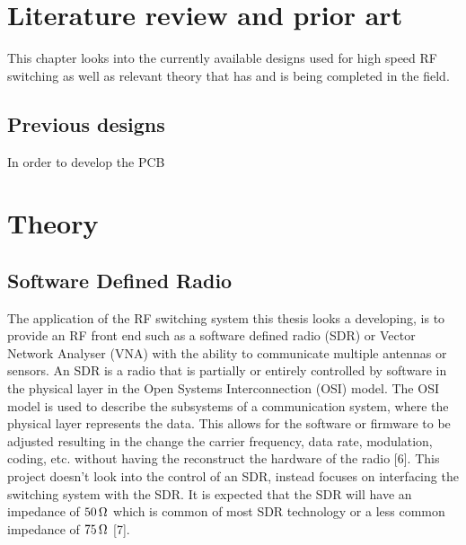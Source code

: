 \documentclass[12pt,openany,a4paper]{book}
\newcommand{\ohm}	{\ensuremath{\rm\,\Omega}}
\begin{document}
\chapter{Literature review and prior art}

This chapter looks into the currently available designs used for high speed RF switching as well as relevant theory that has and is being completed in the field.


\section{Previous designs}
In order to develop the PCB 















\chapter{Theory}
\section{Software Defined Radio}
The application of the RF switching system this thesis looks a developing, is to provide an RF front end such as a software defined radio (SDR) or Vector Network Analyser (VNA) with the ability to communicate multiple antennas or sensors. An SDR is a radio that is partially or entirely controlled by software in the physical layer in the Open Systems Interconnection (OSI) model. The OSI model is used to describe the subsystems of a communication system, where the physical layer represents the data. This allows for the software or firmware to be adjusted resulting in the change the carrier frequency, data rate, modulation, coding, etc. without having the reconstruct the hardware of the radio [6]. This project doesn't look into the control of an SDR, instead focuses on interfacing the switching system with the SDR. It is expected that the SDR will have an impedance of $50\ohm$ which is common of most SDR technology or a less common impedance of $75\ohm$ [7].
\end{document}
